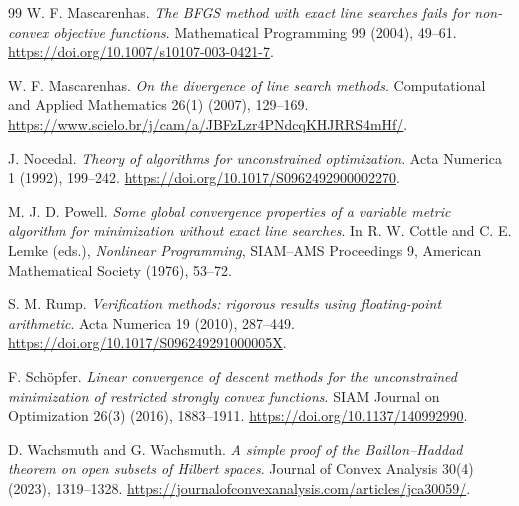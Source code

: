 \begin{thebibliography}{99}
 W. F. Mascarenhas. \emph{The BFGS method with exact line searches fails for non-convex objective functions}. Mathematical Programming 99 (2004), 49--61. \url{https://doi.org/10.1007/s10107-003-0421-7}.

 W. F. Mascarenhas. \emph{On the divergence of line search methods}. Computational and Applied Mathematics 26(1) (2007), 129--169. \url{https://www.scielo.br/j/cam/a/JBFzLzr4PNdcqKHJRRS4mHf/}.

 J. Nocedal. \emph{Theory of algorithms for unconstrained optimization}. Acta Numerica 1 (1992), 199--242. \url{https://doi.org/10.1017/S0962492900002270}.

 M. J. D. Powell. \emph{Some global convergence properties of a variable metric algorithm for minimization without exact line searches}. In R. W. Cottle and C. E. Lemke (eds.), \emph{Nonlinear Programming}, SIAM--AMS Proceedings 9, American Mathematical Society (1976), 53--72.

 S. M. Rump. \emph{Verification methods: rigorous results using floating-point arithmetic}. Acta Numerica 19 (2010), 287--449. \url{https://doi.org/10.1017/S096249291000005X}.

 F. Sch\"opfer. \emph{Linear convergence of descent methods for the unconstrained minimization of restricted strongly convex functions}. SIAM Journal on Optimization 26(3) (2016), 1883--1911. \url{https://doi.org/10.1137/140992990}.

 D. Wachsmuth and G. Wachsmuth. \emph{A simple proof of the Baillon--Haddad theorem on open subsets of Hilbert spaces}. Journal of Convex Analysis 30(4) (2023), 1319--1328. \url{https://journalofconvexanalysis.com/articles/jca30059/}.

\end{thebibliography}
